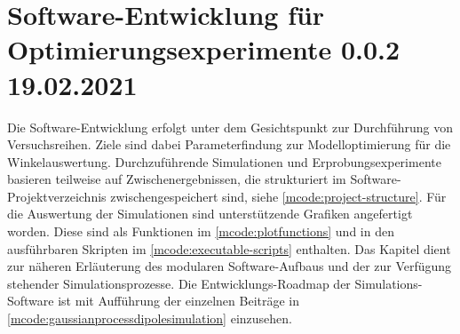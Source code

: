 %

\chapter{Software-Entwicklung für Optimierungsexperimente 0.0.2 19.02.2021}\label{ch:sw-entwicklung-f-opt-exp}


Die Software-Entwicklung erfolgt unter dem Gesichtspunkt zur Durchführung von Versuchsreihen. Ziele sind dabei Parameterfindung zur Modelloptimierung für die Winkelauswertung. Durchzuführende Simulationen und  Erprobungsexperimente basieren teilweise auf Zwischenergebnissen, die strukturiert im Software-Projektverzeichnis zwischengespeichert sind, siehe \autoref{mcode:project-structure}. Für die Auswertung der Simulationen sind unterstützende Grafiken angefertigt worden. Diese sind als Funktionen im \autoref{mcode:plotfunctions} und in den ausführbaren Skripten im \autoref{mcode:executable-scripts} enthalten. Das Kapitel dient zur näheren Erläuterung des modularen Software-Aufbaus und der zur Verfügung stehender Simulationsprozesse. Die Entwicklungs-Roadmap der Simulations-Software ist mit Aufführung der einzelnen Beiträge in \autoref{mcode:gaussianprocessdipolesimulation} einzusehen.



